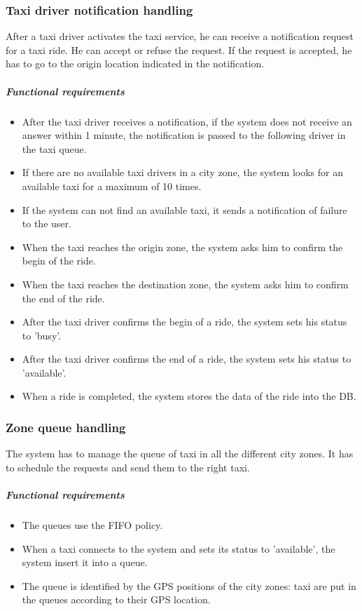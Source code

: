 \subsubsection{Taxi driver notification handling}
After a taxi driver activates the taxi service, he can receive a notification request for a taxi ride. He can accept or refuse the request. If the request is accepted, he has to go to the origin location indicated in the notification.

    \subparagraph{Functional requirements}
    \noindent
        \begin{itemize}
            \item After the taxi driver receives a notification, if the system does not receive an answer within 1 minute, the notification is passed to the following driver in the taxi queue.
            \item If there are no available taxi drivers in a city zone, the system looks for an available taxi for a maximum of 10 times. 
            \item If the system can not find an available taxi, it sends a notification of failure to the user.
            \item When the taxi reaches the origin zone, the system asks him to confirm the begin of the ride.
            \item When the taxi reaches the destination zone, the system asks him to confirm the end of the ride.
            \item After the taxi driver confirms the begin of a ride, the system sets his status to 'busy'.
            \item After the taxi driver confirms the end of a ride, the system sets his status to 'available'.
            \item When a ride is completed, the system stores the data of the ride into the DB.
        \end{itemize}
        
        
\subsubsection{Zone queue handling}
The system has to manage the queue of taxi in all the different city zones. It has to schedule the requests and send them to the right taxi.
    
	\subparagraph{Functional requirements}
	\noindent
	    \begin{itemize}
	        \item The queues use the FIFO policy.
	        \item When a taxi connects to the system and sets its status to 'available', the system insert it into a queue.
	        \item The queue is identified by the GPS positions of the city zones: taxi are put in the queues according to their GPS location.
	    \end{itemize}
    
